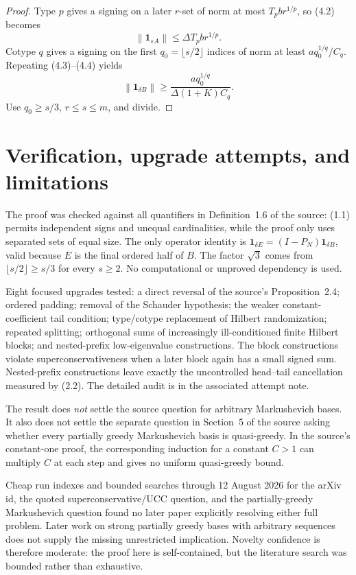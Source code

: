 \documentclass[11pt]{article}
\newcommand{\norm}[1]{\left\lVert #1\right\rVert}
\newcommand{\one}[2]{\mathbf 1_{#1 #2}}
\begin{document}
\begin{proof}
Type $p$ gives a signing on a later $r$-set of norm at most
$T_pb r^{1/p}$, so (4.2) becomes
\[
 \norm{\one{\varepsilon}{A}}\le\Delta T_pb r^{1/p}.
\]
Cotype $q$ gives a signing on the first $q_0=\lfloor s/2\rfloor$ indices
of norm at least $a q_0^{1/q}/C_q$.  Repeating (4.3)--(4.4) yields
\[
 \norm{\one{\delta}{B}}
 \ge\frac{a q_0^{1/q}}{\Delta(1+K)C_q}.
\]
Use $q_0\ge s/3$, $r\le s\le m$, and divide.
\end{proof}

\section{Verification, upgrade attempts, and limitations}

The proof was checked against all quantifiers in Definition~1.6 of the
source: (1.1) permits independent signs and unequal cardinalities, while the
proof only uses separated sets of equal size.  The only operator identity is
$\one{\delta}{E}=(I-P_N)\one{\delta}{B}$, valid because $E$ is the final
ordered half of $B$.  The factor $\sqrt3$ comes from
$\lfloor s/2\rfloor\ge s/3$ for every $s\ge2$.  No computational or
unproved dependency is used.

Eight focused upgrades tested: a direct reversal of the source's
Proposition~2.4; ordered padding; removal of the Schauder hypothesis; the
weaker constant-coefficient tail condition; type/cotype replacement of
Hilbert randomization; repeated splitting; orthogonal sums of increasingly
ill-conditioned finite Hilbert blocks; and nested-prefix low-eigenvalue
constructions.  The block constructions violate superconservativeness when a
later block again has a small signed sum.  Nested-prefix constructions leave
exactly the uncontrolled head--tail cancellation measured by (2.2).  The
detailed audit is in the associated attempt note.

The result does \emph{not} settle the source question for arbitrary
Markushevich bases.  It also does not settle the separate question in
Section~5 of the source asking whether every partially greedy Markushevich
basis is quasi-greedy.  In the source's constant-one proof, the corresponding
induction for a constant $C>1$ can multiply $C$ at each step and gives no
uniform quasi-greedy bound.

Cheap run indexes and bounded searches through 12 August 2026 for the arXiv
id, the quoted superconservative/UCC question, and the partially-greedy
Markushevich question found no later paper explicitly resolving either full
problem.  Later work on strong partially greedy bases with arbitrary
sequences does not supply the missing unrestricted implication.  Novelty
confidence is therefore moderate: the proof here is self-contained, but the
literature search was bounded rather than exhaustive.
\end{document}
